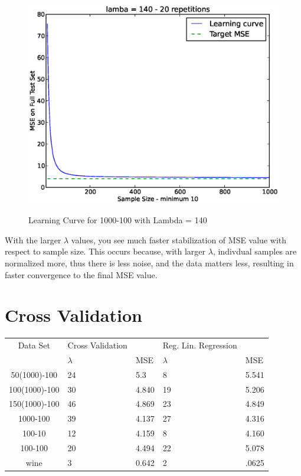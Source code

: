 \documentclass[12pt]{article}
\begin{document}
\begin{figure}[h]
\includegraphics[height=.5\textheight]{2/1000-100-140-20-problem2.eps}
\label{fig:2-140}
\caption{Learning Curve for 1000-100 with Lambda = 140}
\end{figure}

With the larger $\lambda$ values, you see much faster stabilization of MSE value with respect to sample size.  This occurs because, with larger $\lambda$, indivdual samples are normalized more, thus there is less noise, and the data matters less, resulting in faster convergence to the final MSE value.

\section{Cross Validation}

\begin{table}[h]
\begin{tabular}{c||p{3cm}|p{3cm}||p{3cm}|p{3cm}}
Data Set & Cross Validation  &  & Reg. Lin. Regression &  \\
 & $\lambda$ & MSE & $\lambda$ & MSE \\
\hline
50(1000)-100 & 24 & 5.3 & 8 & 5.541\\
100(1000)-100 & 30 & 4.840 & 19 & 5.206 \\
150(1000)-100 & 46 & 4.869 & 23 & 4.849 \\
1000-100 & 39 & 4.137 & 27 & 4.316 \\
100-10 & 12 & 4.159 & 8 & 4.160\\
100-100 & 20 & 4.494 & 22 & 5.078\\
wine & 3 & 0.642 & 2 & .0625\\
\end{tabular}
\label{tab:3}
\end{table}
\end{document}

